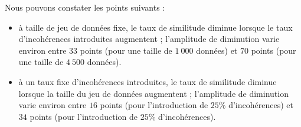 			Nous pouvons constater les points suivants :
			\begin{itemize}
				\item à taille de jeu de données fixe, le taux de similitude diminue lorsque le taux d'incohérences introduites augmentent ;
				l'amplitude de diminution varie environ entre $33$ points (pour une taille de $1~000$ données) et $70$ points (pour une taille de $4~500$ données).
				\item à un taux fixe d'incohérences introduites, le taux de similitude diminue lorsque la taille du jeu de données augmentent ;
				l'amplitude de diminution varie environ entre $16$ points (pour l'introduction de $25$\% d'incohérences) et $34$ points (pour l'introduction de $25$\% d'incohérences).
			\end{itemize}
			
